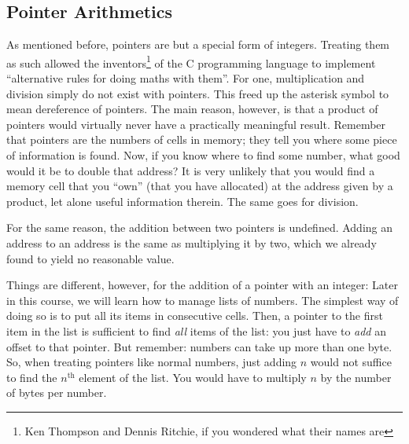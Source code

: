 {{{{\subsection{Pointer Arithmetics}
As mentioned before, pointers are but a special form of integers. Treating them as such allowed the inventors\footnote{Ken Thompson and Dennis Ritchie, if you wondered what their names are} of the C programming language to implement \enquote{alternative rules for doing maths with them}. For one, multiplication and  division simply do not exist with pointers. This freed up the asterisk symbol to mean dereference of pointers. The main reason, however, is that a product of pointers would virtually never have a practically meaningful result. Remember that pointers are the numbers of cells in memory; they tell you where some piece of information is found. Now, if you know where to find some number, what good would it be to double that address? It is very unlikely that you would find a memory cell that you \enquote{own} (\ie that you have allocated) at the address given by a product, let alone useful information therein. The same goes for division.

For the same reason, the addition between two pointers is undefined. Adding an address to an address is the same as multiplying it by two, which we already found to yield no reasonable value.

Things are different, however, for the addition of a pointer with an integer: Later in this course, we will learn how to manage lists of numbers. The simplest way of doing so is to put all its items in consecutive cells. Then, a pointer to the first item in the list is sufficient to find \emph{all} items of the list: you just have to \emph{add} an offset to that pointer. But remember: numbers can take up more than one byte. So, when treating pointers like normal numbers, just adding $n$ would not suffice to find the $n^{\text{th}}$ element of the list. You would have to multiply $n$ by the number of bytes per number.

\begin{defbox}
\begin{center}
\end{center}
\end{defbox}}}}}
